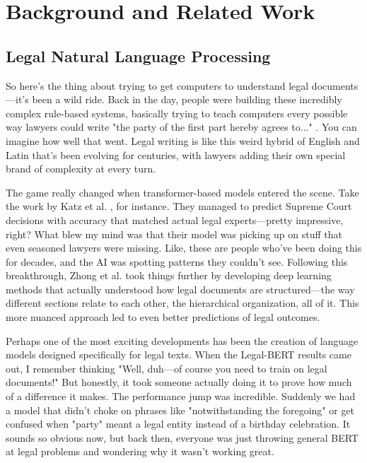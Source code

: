 \section{Background and Related Work}

\subsection{Legal Natural Language Processing}

So here's the thing about trying to get computers to understand legal documents—it's been a wild ride. Back in the day, people were building these incredibly complex rule-based systems, basically trying to teach computers every possible way lawyers could write "the party of the first part hereby agrees to..." \cite{sulea2017exploring}. You can imagine how well that went. Legal writing is like this weird hybrid of English and Latin that's been evolving for centuries, with lawyers adding their own special brand of complexity at every turn.

The game really changed when transformer-based models entered the scene. Take the work by Katz et al. \cite{katz2017general}, for instance. They managed to predict Supreme Court decisions with accuracy that matched actual legal experts—pretty impressive, right? What blew my mind was that their model was picking up on stuff that even seasoned lawyers were missing. Like, these are people who've been doing this for decades, and the AI was spotting patterns they couldn't see. Following this breakthrough, Zhong et al. \cite{zhong2018legal} took things further by developing deep learning methods that actually understood how legal documents are structured—the way different sections relate to each other, the hierarchical organization, all of it. This more nuanced approach led to even better predictions of legal outcomes.

Perhaps one of the most exciting developments has been the creation of language models designed specifically for legal texts. When the Legal-BERT \cite{chalkidis2020legal} results came out, I remember thinking "Well, duh—of course you need to train on legal documents!" But honestly, it took someone actually doing it to prove how much of a difference it makes. The performance jump was incredible. Suddenly we had a model that didn't choke on phrases like "notwithstanding the foregoing" or get confused when "party" meant a legal entity instead of a birthday celebration. It sounds so obvious now, but back then, everyone was just throwing general BERT at legal problems and wondering why it wasn't working great.

